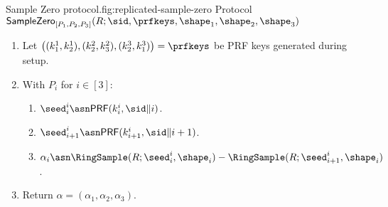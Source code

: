 \begin{Boxfig}{Sample Zero protocol.}{fig:replicated-sample-zero}
  {Protocol $\mathsf{SampleZero}_{[P_1, P_2, P_3]}(R; \sid, \prfkeys, \shape_1, \shape_2, \shape_3)$}
  
  \begin{enumerate}
  \item Let $\left( (k_1^1, k_2^1), (k_2^2, k_3^2), (k_2^3, k_1^3) \right) = \prfkeys$ be PRF keys generated during setup.
  
  \item With $P_i$ for $i \in [3]$:
  \begin{enumerate}
    \item ${\seed}^i_i \asn \mathsf{PRF}(k^i_i, \sid \| i)$.
    \item ${\seed}^i_{i+1} \asn \mathsf{PRF}(k^i_{i+1}, \sid \| i + 1)$.
    \item $\alpha_i \asn \RingSample(R; \seed^i_i, \shape_i) - \RingSample(R; \seed^i_{i+1}, \shape_i)$.
  \end{enumerate}
  
  \item Return $\alpha = \left( \alpha_1, \alpha_2, \alpha_3 \right)$.
  \end{enumerate}
\end{Boxfig}